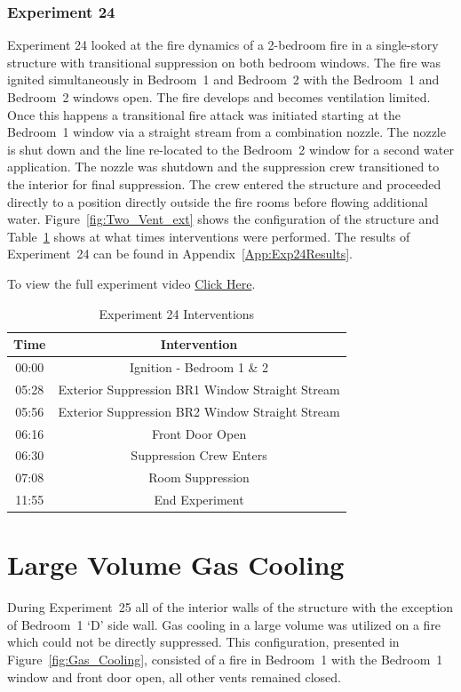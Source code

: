 \documentclass[12pt,oneside]{book}
\begin{document}
\subsubsection{Experiment 24}
Experiment 24 looked at the fire dynamics of a 2-bedroom fire in a single-story structure with transitional suppression on both bedroom windows. The fire was ignited simultaneously in Bedroom~1 and Bedroom~2 with the Bedroom~1 and Bedroom~2 windows open. The fire develops and becomes ventilation limited. Once this happens a transitional fire attack was initiated starting at the Bedroom~1 window via a straight stream from a combination nozzle. The nozzle is shut down and the line re-located to the Bedroom~2 window for a second water application. The nozzle was shutdown and the suppression crew transitioned to the interior for final suppression. The crew entered the structure and proceeded directly to a position directly outside the fire rooms before flowing additional water. Figure~\ref{fig:Two_Vent_ext} shows the configuration of the structure and Table~\ref{Table:Exp24Interventions} shows at what times interventions were performed. The results of Experiment~24 can be found in Appendix~\ref{App:Exp24Results}. 

To view the full experiment video \href{https://player.vimeo.com/video/170499626?autoplay=1}{Click Here}.

\begin{table}[H]
	\centering
	\caption{Experiment 24 Interventions}
	\begin{tabular}{|c|c|} 
		\hline
		Time & Intervention \\ \hline \hline
		00:00 & Ignition - Bedroom 1 \& 2 \\ \hline
		05:28 & Exterior Suppression BR1 Window Straight Stream \\ \hline
		05:56 & Exterior Suppression BR2 Window Straight Stream \\ \hline		
		06:16 & Front Door Open \\ \hline
		06:30 & Suppression Crew Enters\\ \hline
		07:08 & Room Suppression \\ \hline 
		11:55 & End Experiment\\ \hline
	\end{tabular}
	\label{Table:Exp24Interventions}
\end{table}

\clearpage

\section{Large Volume Gas Cooling}
During Experiment~25 all of the interior walls of the structure with the exception of Bedroom~1 `D' side wall. Gas cooling in a large volume was utilized on a fire which could not be directly suppressed. This configuration, presented in Figure~\ref{fig:Gas_Cooling}, consisted of a fire in Bedroom~1 with the Bedroom~1 window and front door open, all other vents remained closed.  
\end{document}
